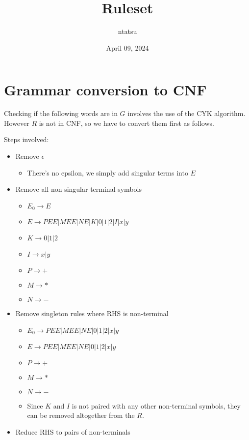 \documentclass{article}
\title{Ruleset}
\author{ntatsu}
\date{April 09, 2024}
\theoremstyle{definition}
\theoremstyle{remark}
\begin{document}
\maketitle

\section{Grammar conversion to CNF}
Checking if the following words are in $G$ involves the use of the CYK algorithm. However $R$ is not in CNF, so we have to convert them first as follows.

Steps involved:

\begin{itemize}
    \item Remove $\epsilon$
    \begin{itemize}
        \item There's no epsilon, we simply add singular terms into $E$
    \end{itemize}
    \item Remove all non-singular terminal symbols
    \begin{itemize}
        \item $E_0 \rightarrow E$
        \item $E \rightarrow PEE | MEE | NE | K | 0 | 1 | 2 | I | x | y$
        \item $K \rightarrow 0 | 1 | 2$
        \item $I \rightarrow x | y$
        \item $P \rightarrow +$
        \item $M \rightarrow *$
        \item $N \rightarrow -$
    \end{itemize}
    \item Remove singleton rules where RHS is non-terminal
    \begin{itemize}
        \item $E_0 \rightarrow PEE | MEE | NE | 0 | 1 | 2 | x | y$
        \item $E \rightarrow PEE | MEE | NE | 0 | 1 | 2 | x | y$
        \item $P \rightarrow +$
        \item $M \rightarrow *$
        \item $N \rightarrow -$
        \item Since $K$ and $I$ is not paired with any other non-terminal symbols, they can be removed altogether from the $R$.
    \end{itemize}
    \item Reduce RHS to pairs of non-terminals

\end{itemize}
\end{document}
